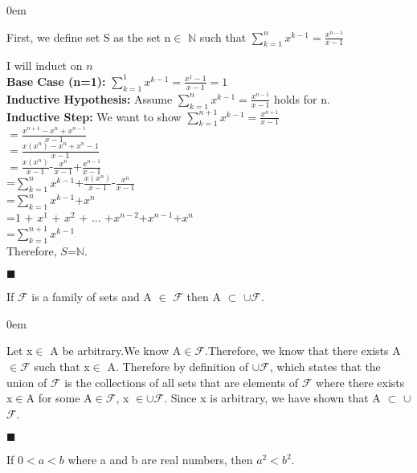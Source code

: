 \documentclass[12pt]{article}
\renewcommand{\qed}{\hfill$\blacksquare$}
\renewenvironment{proof}{\begin{addmargin}[1em]{0em}\begin{newproof}}{\end{newproof}\end{addmargin}\qed}
\newenvironment{theorem}[2][Theorem]{\begin{trivlist}
\item[\hskip \labelsep {\bfseries #1}\hskip \labelsep {\bfseries #2.}]}{\end{trivlist}}
\begin{document}
\begin{proof}[Proof]
First, we define set S as the set {n$\in$ $\mathbb{N}$} such that $\sum_{k=1}^{n}x^{k-1}= \frac{x^{n-1}}{x-1}$ 

I will induct on $n$ \\
\textbf{Base Case (n=1): } $\sum_{k=1}^{1}x^{k-1} = \frac{x^{1}-1}{x-1}=1$\\

\textbf{Inductive Hypothesis: } Assume $\sum_{k=1}^{n}x^{k-1}= \frac{x^{n-1}}{x-1}$ holds for n. \\

\textbf{Inductive Step: } We want to show $\sum_{k=1}^{n+1}x^{k-1}= \frac{x^{n+1}}{x-1}$ \\
$=\frac{x^{n+1}-x^{n}+x^{n-1}}{x-1}$\\
$=\frac{x(x^{n})-x^{n}+x^{n}-1}{x-1}$\\
$=\frac{x(x^{n})}{x-1}$-$\frac{x^{n}}{x-1}$+$\frac{x^{n-1}}{x-1}$\\
=$\sum_{k=1}^{n}x^{k-1}$+$\frac{x(x^{n})}{x-1}$-$\frac{x^{n}}{x-1}$\\
=$\sum_{k=1}^{n}x^{k-1}$+$x^{n}$\\
=$1$ + $x^{1}$ + $x^{2}$ + ... +$x^{n-2}$+$x^{n-1}$+$x^{n}$\\
=$\sum_{k=1}^{n+1}x^{k-1}$\\
Therefore, $S$=$\mathbb{N}$.

\end{proof}
 
\begin{theorem}{3.2}
If $\mathcal{F}$ is a family of sets and A $\in$ $\mathcal{F}$ then A $\subset$ $\cup$$\mathcal{F}$.

\end{theorem}

\begin{proof}[Proof]
Let x$\in$ A be arbitrary.We know A$\in$$\mathcal{F}$.Therefore, we know that there exists A $\in$$\mathcal{F}$ such that x$\in$ A. Therefore by definition of $\cup$$\mathcal{F}$, which states that the union of $\mathcal{F}$ is the collections of all sets that are elements of $\mathcal{F}$ where there exists x$\in$A for some A$\in$$\mathcal{F}$, x $\in$$\cup$$\mathcal{F}$. Since x is arbitrary, we have shown that A $\subset$ $\cup$$\mathcal{F}$.

\end{proof}

\begin{theorem}{6.1}
If $0< a < b$ where a and b are real numbers, then $a^{2} < b^{2}$.


\end{theorem}
\end{document}
